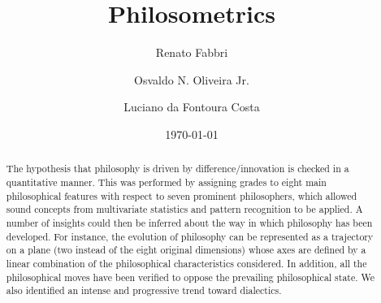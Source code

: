 \documentclass[%
 aip,
 jmp,%
 amsmath,amssymb,
 reprint,%
]{revtex4-1}
\begin{document}

\title[Philosometrics]{Philosometrics}%

\author{Renato Fabbri}%

\author{Osvaldo N. Oliveira Jr.}

\author{Luciano da Fontoura Costa}

\date{\today}%

\begin{abstract}
The hypothesis that philosophy is driven by difference/innovation is
checked in a quantitative manner. This was performed by assigning
grades to eight main philosophical features with respect to seven
prominent philosophers, which allowed sound concepts from multivariate
statistics and pattern recognition to be applied. A number of insights
could then be inferred about the way in which philosophy has been
developed. For instance, the evolution of philosophy can be
represented as a trajectory on a plane (two instead of the eight
original dimensions) whose axes are defined by a linear combination of
the philosophical characteristics considered.  In addition, all the
philosophical moves have been verified to oppose the prevailing
philosophical state.  We also identified an intense and progressive
trend toward dialectics.
\end{abstract}

\maketitle
\end{document}
